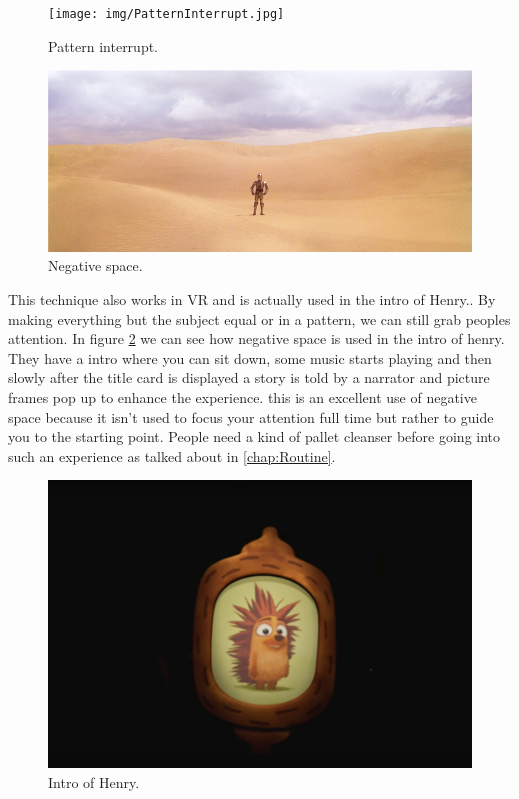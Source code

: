 \documentclass{report}
\begin{document}
				
				\begin{figure}[!h]
					\centering
					\begin{minipage}[b!]{0.35\textwidth}
						\texttt{[image: img/PatternInterrupt.jpg]}
						\caption{Pattern interrupt.}
						\label{fig:PatternInterrupt}
					\end{minipage}
					\hfill
					\begin{minipage}[b!]{0.4\textwidth}
						\includegraphics[width=\textwidth]{img/C3PONegativeSpace.png}
						\caption{Negative space.}
						\label{fig:NegativeSpace}
					\end{minipage}
				\end{figure}
				
				This technique also works in VR and is actually used in the intro of Henry..	By making everything but the subject equal or in a pattern, we can still grab peoples attention. 				
				In figure \ref{fig:henryIntro} we can see how negative space is used in the intro of henry. They have a intro where you can sit down, some music starts playing and then slowly after the title card is displayed a story is told by a narrator and picture frames pop up to enhance the experience. this is an excellent use of negative space because it isn't used to focus your attention full time but rather to guide you to the starting point. People need a kind of pallet cleanser before going into such an experience as talked about in \autoref{chap:Routine}.
				
				\begin{figure}[h!]
					\centering
					 \includegraphics[width=\linewidth/2]{img/henry_intro.png}
					\caption{Intro of Henry.}
					\label{fig:henryIntro}
				\end{figure}
\end{document}
